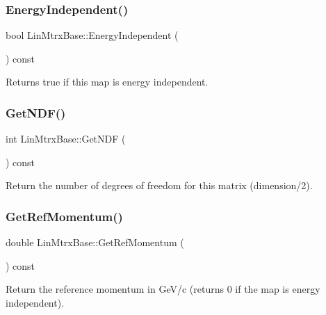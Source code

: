 \subsubsection{\texorpdfstring{Energy\+Independent()}{EnergyIndependent()}}
{\footnotesize\ttfamily bool Lin\+Mtrx\+Base\+::\+Energy\+Independent (\begin{DoxyParamCaption}{ }\end{DoxyParamCaption}) const\hspace{0.3cm}{\ttfamily [inline]}}

Returns true if this map is energy independent. \mbox{\label{classLinMtrxBase_abd9d5bbf418c4f59c0b8398e563e9145}} 
\subsubsection{\texorpdfstring{Get\+N\+D\+F()}{GetNDF()}}
{\footnotesize\ttfamily int Lin\+Mtrx\+Base\+::\+Get\+N\+DF (\begin{DoxyParamCaption}{ }\end{DoxyParamCaption}) const\hspace{0.3cm}{\ttfamily [inline]}}

Return the number of degrees of freedom for this matrix (dimension/2). \mbox{\label{classLinMtrxBase_ad87096504b60b12224fdd87ad8120d37}} 
\subsubsection{\texorpdfstring{Get\+Ref\+Momentum()}{GetRefMomentum()}}
{\footnotesize\ttfamily double Lin\+Mtrx\+Base\+::\+Get\+Ref\+Momentum (\begin{DoxyParamCaption}{ }\end{DoxyParamCaption}) const\hspace{0.3cm}{\ttfamily [inline]}}

Return the reference momentum in Ge\+V/c (returns 0 if the map is energy independent). \mbox{\label{classLinMtrxBase_a9123e5c023982c2602d7d42d5a5ddf9c}} 
